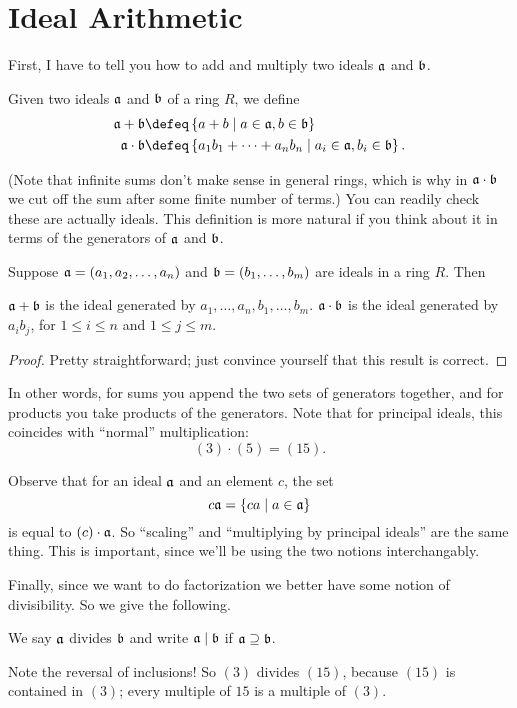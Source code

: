 \section{Ideal Arithmetic}
First, I have to tell you how to add and multiply two ideals $\aa$ and $\bb$.
\begin{definition}
	Given two ideals $\aa$ and $\bb$ of a ring $R$, we define
	\begin{align*}
		\aa + \bb &\defeq \left\{ a+b \mid a \in \aa, b \in \bb \right\} \\
		\aa \cdot \bb &\defeq \left\{ a_1b_1 + \dots + a_nb_n \mid a_i \in \aa, b_i \in \bb \right\}.
	\end{align*}
\end{definition}
(Note that infinite sums don't make sense in general rings, which is why in $\aa \cdot \bb$
we cut off the sum after some finite number of terms.)
You can readily check these are actually ideals.
This definition is more natural if you think about it in terms of 
the generators of $\aa$ and $\bb$.
\begin{proposition}
	Suppose $\aa = \left( a_1, a_2, \dots, a_n \right)$
	and $\bb = \left( b_1, \dots, b_m \right)$ are ideals in a ring $R$.
	Then
	\begin{enumerate}[(a)]
		\ii $\aa + \bb$ is the ideal generated by $a_1, \dots, a_n, b_1, \dots, b_m$.
		\ii $\aa \cdot \bb$ is the ideal generated by $a_i b_j$, for $1 \le i \le n$ and $1 \le j \le m$.
	\end{enumerate}
\end{proposition}
\begin{proof}
	Pretty straightforward; just convince yourself that this result is correct.
\end{proof}
In other words, for sums you append the two sets of generators together,
and for products you take products of the generators.
Note that for principal ideals, this coincides with ``normal'' multiplication:
\[ (3) \cdot (5) = (15). \]
\begin{remark}
	Observe that for an ideal $\aa$ and an element $c$,
	the set \[ c \aa = \left\{ ca \mid a \in \aa \right\} \]
	is equal to $(c) \cdot \aa$.
	So ``scaling'' and ``multiplying by principal ideals'' are the same thing.
	This is important, since we'll be using the two notions interchangably.
\end{remark}

Finally, since we want to do factorization we better have some notion of divisibility.
So we give the following.
\begin{definition}
	We say $\aa$ divides $\bb$ and write $\aa \mid \bb$ if $\aa \supseteq \bb$.
\end{definition}
Note the reversal of inclusions!
So $(3)$ divides $(15)$, because $(15)$ is contained in $(3)$;
every multiple of $15$ is a multiple of $(3)$.

